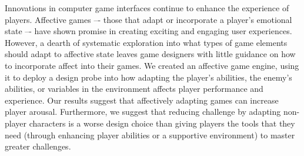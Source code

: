 
Innovations in computer game interfaces continue to enhance the experience of players. Affective games –- those that adapt or incorporate a player's emotional state –- have shown promise in creating exciting and engaging user experiences. However, a dearth of systematic exploration into what types of game elements should adapt to affective state leaves game designers with little guidance on how to incorporate affect into their games. We created an affective game engine, using it to deploy a design probe into how adapting the player's abilities, the enemy's abilities, or variables in the environment affects player performance and experience. Our results suggest that affectively adapting games can increase player arousal. Furthermore, we suggest that reducing challenge by adapting non-player characters is a worse design choice than giving players the tools that they need (through enhancing player abilities or a supportive environment) to master greater challenges.
